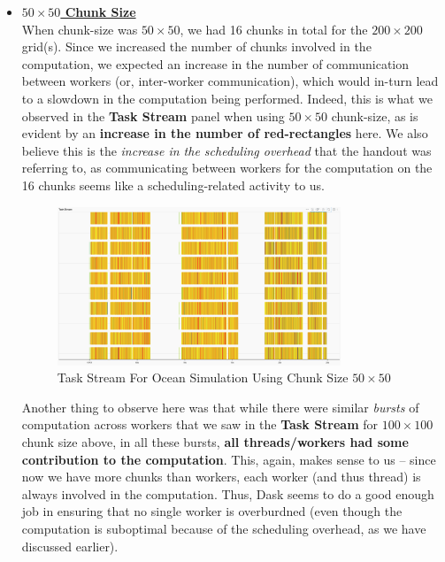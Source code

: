 \documentclass[a4paper,12pt]{article}
\begin{document}
\begin{itemize}

\item \textbf{\underline{$50 \times 50$ Chunk Size}} \\
When chunk-size was $50 \times 50$, we had 16 chunks in total for the $200 \times 200$ grid(s). Since we increased the number of chunks involved in the computation, we expected an increase in the number of communication between workers (or, inter-worker communication), which would in-turn lead to a slowdown in the computation being performed. Indeed, this is what we observed in the \textbf{Task Stream} panel when using $50 \times 50$ chunk-size, as is evident by an \textbf{increase in the number of red-rectangles} here. We also believe this is the \textit{increase in the scheduling overhead} that the handout was referring to, as communicating between workers for the computation on the 16 chunks seems like a scheduling-related activity to us.

\begin{figure}[H]
  \centering
  \includegraphics[width=0.8\textwidth]{../images/task_stream_50chunk.png}
  \caption{Task Stream For Ocean Simulation Using Chunk Size $50 \times 50$}
\end{figure}

Another thing to observe here was that while there were similar \textit{bursts} of computation across workers that we saw in the \textbf{Task Stream} for $100 \times 100$ chunk size above, in all these bursts, \textbf{all threads/workers had some contribution to the computation}. This, again, makes sense to us -- since now we have more chunks than workers, each worker (and thus thread) is always involved in the computation. Thus, Dask seems to do a good enough job in ensuring that no single worker is overburdned (even though the computation is suboptimal because of the scheduling overhead, as we have discussed earlier). 


\end{itemize}
\end{document}
